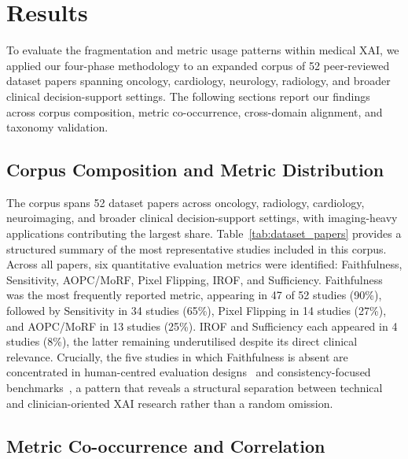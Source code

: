 \section{Results}

To evaluate the fragmentation and metric usage patterns within medical XAI,
we applied our four-phase methodology to an expanded corpus of 52 peer-reviewed
dataset papers spanning oncology, cardiology, neurology, radiology, and broader
clinical decision-support settings. The following sections report our findings across corpus
composition, metric co-occurrence, cross-domain alignment, and taxonomy
validation.

\subsection{Corpus Composition and Metric Distribution}

The corpus spans 52 dataset papers across oncology, radiology, cardiology,
neuroimaging, and broader clinical decision-support settings, with imaging-heavy
applications contributing the largest share.
Table~\ref{tab:dataset_papers} provides a structured
summary of the most representative studies included in this corpus. Across
all papers, six quantitative evaluation metrics were identified:
Faithfulness, Sensitivity, AOPC/MoRF, Pixel Flipping, IROF, and
Sufficiency. Faithfulness was the most frequently reported metric,
appearing in 47 of 52 studies (90\%), followed by Sensitivity in 34 studies
(65\%), Pixel Flipping in 14 studies (27\%), and AOPC/MoRF in 13 studies
(25\%). IROF and Sufficiency each appeared in 4 studies (8\%), the latter
remaining underutilised despite its direct clinical relevance. Crucially,
the five studies in which Faithfulness is absent are concentrated in
human-centred evaluation designs~\cite{rezaeian2026explainability,finzel2024human,bauer2025human}
and consistency-focused benchmarks~\cite{qin2025consistency,alpsalaz2026explainability},
a pattern that reveals a structural separation between technical and
clinician-oriented XAI research rather than a random omission.



\subsection{Metric Co-occurrence and Correlation}

